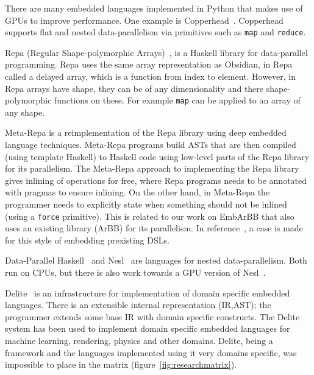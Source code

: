 \documentclass[a4paper]{book}
\begin{document}
There are many embedded languages implemented in Python that makes use of GPUs 
to improve performance. One example is Copperhead~\citet{copperhead}. Copperhead 
supports flat and nested data-parallelism via primitives such as {\tt map} and 
{\tt reduce}.  


Repa (Regular Shape-polymorphic Arrays)~\citet{REPA}, is a Haskell library for 
data-parallel programming. 
Repa uses the same array representation as Obsidian, in Repa called a delayed
array, which is a function from index to element. However, in Repa arrays have shape, 
they can be of any dimensionality and there shape-polymorphic functions on these. 
For example {\tt map} can be applied to an array of any shape. 

Meta-Repa is a reimplementation of the Repa library using deep embedded language 
techniques. Meta-Repa programs build ASTs that are then compiled (using template 
Haskell) to Haskell code using low-level parts of the Repa library for its parallelism.
The Meta-Repa approach to implementing the Repa library 
gives inlining of operations for free, where Repa programs needs to be annotated 
with pragmas to ensure inlining. On the other hand, in Meta-Repa the programmer 
needs to explicitly state when something should not be inlined (using a {\tt force} primitive).
This is related to our work on EmbArBB that also uses an existing library (ArBB) 
for its parallelism. In reference~\citet{FPCDSL}, a case is made for this style 
of embedding prexisting DSLs. 


Data-Parallel Haskell~\citet{DPH} and Nesl~\citet{NESL} are languages for 
nested data-parallelism. Both run on CPUs, but there is also work towards 
a GPU version of Nesl~\citet{NestedGPU}. 


Delite~\citet{DELITE} is an infrastructure for implementation of domain 
specific embedded languages. There is an extensible internal representation (IR,AST); 
the programmer extends some base IR with domain specific constructs. The Delite system 
has been used to implement domain specific embedded languages for machine learning, rendering, 
physics and other domains. Delite, being a framework and the languages implemented using it 
very domains specific, was impossible to place in the matrix (figure~\ref{fig:researchmatrix}). 
\end{document}
